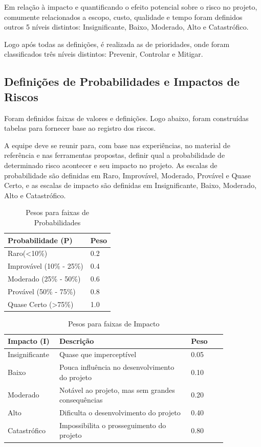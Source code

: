 \begin{apendicesenv}
Em relação à impacto e quantificando o efeito potencial sobre o risco no projeto, comumente relacionados a escopo, custo, qualidade e tempo foram definidos outros 5 níveis distintos: Insignificante, Baixo, Moderado, Alto e Catastrófico.

Logo após todas as definições, é realizada as de prioridades, onde foram classificados três níveis distintos: Prevenir, Controlar e Mitigar.


\subsection{Definições de Probabilidades e Impactos de Riscos}
Foram definidos faixas de valores e definições. Logo abaixo, foram construídas tabelas para fornecer base ao registro dos riscos.

A equipe deve se reunir para, com base nas experiências, no material de referência e nas ferramentas propostas, definir qual a probabilidade de determinado risco acontecer e seu impacto no projeto. As escalas de probabilidade são definidas em Raro, Improvável, Moderado, Provável e Quase Certo, e as escalas de impacto são definidas em Insignificante, Baixo, Moderado, Alto e Catastrófico.

\begin{table}[htp]
    \centering
    \caption{Pesos para faixas de Probabilidades}
    \label{my-label}
    \begin{tabular}{|l|l|}
    \hline
    \textbf{Probabilidade (P)} & \textbf{Peso} \\ \hline
    Raro(\textless 10\%) & 0.2 \\ \hline
    Improvável (10\% - 25\%) & 0.4 \\ \hline
    Moderado (25\% - 50\%) & 0.6 \\ \hline
    Provável (50\% - 75\%) & 0.8 \\ \hline
    Quase Certo (\textgreater 75\%) & 1.0 \\ \hline
    \end{tabular}
\end{table}

\begin{table}[htp]
    \centering
    \caption{Pesos para faixas de Impacto}
    \label{my-label}
    \begin{tabular}{|p{0.15\linewidth}|p{0.55\linewidth}|p{0.15\linewidth}|}
    \hline
    \textbf{Impacto (I)} & \textbf{Descrição} & \textbf{Peso} \\ \hline
    Insignificante & Quase que imperceptível & 0.05 \\ \hline
    Baixo & Pouca influência no desenvolvimento do projeto & 0.10 \\ \hline
    Moderado & Notável ao projeto, mas sem grandes consequências & 0.20 \\ \hline
    Alto & Dificulta o desenvolvimento do projeto & 0.40 \\ \hline
    Catastrófico & Impossibilita o prosseguimento do projeto & 0.80 \\ \hline
    \end{tabular}
\end{table}


\end{apendicesenv}
